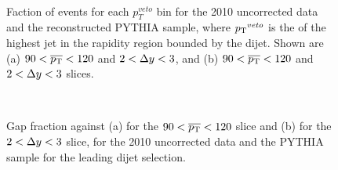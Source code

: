 \begin{figure}
\centering
\mbox{
              \quad
              \quad
                              }
\caption[Comparison of $p_T^{veto}$ distribution between the data and the reconstructed PYTHIA sample ]{
Faction of events for each $p_T^{veto}$ bin for the 2010 uncorrected data and the reconstructed PYTHIA sample, where $\mbox{$p_{\rm T}$}{}^{veto}$ is the \pt{} of the highest jet in the rapidity region bounded by the dijet. 
Shown are (a) $90<\mbox{$\overline{p_{\rm T}}$}{}<120$ and $2 < \mbox{$\Delta y$}{} <3$, and (b) $90<\mbox{$\overline{p_{\rm T}}$}{}<120$ and $2 < \mbox{$\Delta y$}{} <3$ slices.
\label{Uncorr_Pt3_dy}}
\end{figure}

\begin{figure}
\centering
\mbox{
              \quad
              \quad
                              }
\caption[Comparison of gap fraction versus \dy{} and \ptb{} between the data and the reconstructed PYTHIA sample for leading \pt{} dijet selection]{
Gap fraction against (a) \dy{} for the $90<\mbox{$\overline{p_{\rm T}}$}{}<120$ slice and (b) \ptb{} for the $2 < \mbox{$\Delta y$}{} <3$ slice, for the 2010 uncorrected data and the PYTHIA sample for the leading \pt{} dijet selection.
\label{Uncorr_GF}}
\end{figure}


